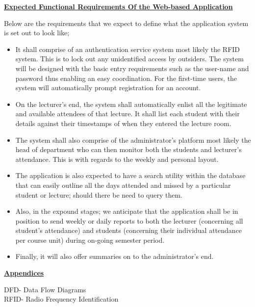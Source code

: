 \documentclass[]{report}
\begin{document}
\begin{flushleft}
\textbf{\underline{Expected Functional Requirements Of the Web-based Application}}\linebreak

Below are the requirements that we expect to define what the application system is set out to look like;
\begin{itemize}
	\item 	It shall comprise of an authentication service system most likely the RFID system. This is to lock out any unidentified access by outsiders. The system will be designed with the basic entry requirements such as the user-name and password thus enabling an easy coordination. For the first-time users, the system will automatically prompt registration for an account.
	\item	On the lecturer’s end, the system shall automatically enlist all the legitimate and available attendees of that lecture. It shall list each student with their details against their timestamps of when they entered the lecture room.
	\item	The system shall also comprise of the administrator’s platform most likely the head of department who can then monitor both the students and lecturer’s attendance. This is with regards to the weekly and personal layout.
	\item 	The application is also expected to have a search utility within the database that can easily outline all the days attended and missed by a particular student or lecture; should there be need to query them.
	\item 	Also, in the expound stages; we anticipate that the application shall be in position to send weekly or daily reports to both the lecturer (concerning all student’s attendance) and students (concerning their individual attendance per course unit) during on-going semester period.
	\item 	Finally, it will also offer summaries on to the administrator’s end.
	
\end{itemize}\linebreak




\textbf{\underline{Appendices}}\linebreak

DFD- Data Flow Diagrams\\
RFID- Radio Frequency Identification























\end{flushleft}
\end{document}
